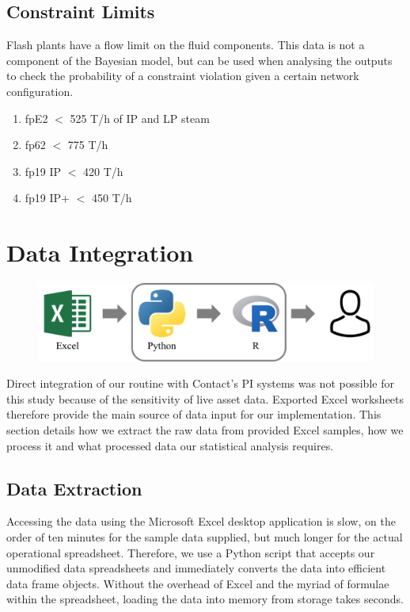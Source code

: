 \documentclass[a4paper, 12pt]{article}
\begin{document}
\subsection{Constraint Limits}
Flash plants have a flow limit on the fluid components. This data is not a component of the Bayesian model, but can be used when analysing the outputs to check the probability of a constraint violation given a certain network configuration.
\begin{enumerate}
\item fpE2 $<$ 525 T/h of IP and LP steam
\item fp62 $<$ 775 T/h
\item fp19 IP $<$ 420 T/h
\item fp19 IP+ $<$ 450 T/h 
\end{enumerate}

\section{Data Integration}

\begin{figure}
  \centering
  \includegraphics[width=0.5\linewidth]{media/workflow}
  \label{fig:workflow}
\end{figure}

Direct integration of our routine with Contact's PI systems was not possible for this study because of the sensitivity of live asset data. Exported Excel worksheets therefore provide the main source of data input for our implementation. This section details how we extract the raw data from provided Excel samples, how we process it and what processed data our statistical analysis requires.

\subsection{Data Extraction}
Accessing the data using the Microsoft Excel desktop application is slow, on the order of ten minutes for the sample data supplied, but much longer for the actual operational spreadsheet. Therefore, we use a Python script that accepts our unmodified data spreadsheets and immediately converts the data into efficient data frame objects. Without the overhead of Excel and the myriad of formulae within the spreadsheet, loading the data into memory from storage takes seconds.
\end{document}
